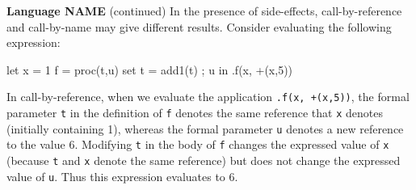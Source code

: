 \begin{minipage}[t]{\sw}
\slidenumber
\LARGE
{\bf Language NAME} (continued)\exx
In the presence of side-effects,
call-by-reference and call-by-name
may give different results.
Consider evaluating the following expression:
{\Large
\begin{qv}
let
  x = 1
  f = proc(t,u)
        {
          set t = add1(t) ;
          u
        }
in
  .f(x, +(x,5))
\end{qv}
}
In call-by-reference,
when we evaluate the application \verb'.f(x, +(x,5))',
the formal parameter \verb't' in the definition of \verb'f' denotes
the same reference that \verb'x' denotes (initially containing 1),
whereas the formal parameter \verb'u' denotes a new reference
to the value 6.
Modifying \verb't' in the body of \verb'f' changes
the expressed value of \verb'x'
(because \verb't' and \verb'x' denote the same reference)
but does not change the expressed value of \verb'u'.
Thus this expression evaluates to 6.
\end{minipage}
\clearpage
